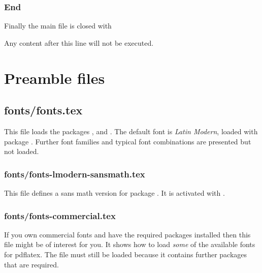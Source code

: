 \subsection{End}
Finally the main file is closed with 

Any content after this line will not be executed.

\chapter{Preamble files}

\section{fonts/fonts.tex}

This file loads the packages ,  and
. The default font is \emph{Latin Modern}, loaded with package . Further font families and typical font combinations 
are presented but not loaded.


\subsection{fonts/fonts-lmodern-sansmath.tex}

This file defines a sans math version for package . 
It is activated with .


\subsection{fonts/fonts-commercial.tex}
If you own commercial fonts and have the required \latex packages installed then this file might be of interest for you. It shows how to load \emph{some} of the available fonts for pdflatex. The file  must still be loaded because it contains further packages that are required.

